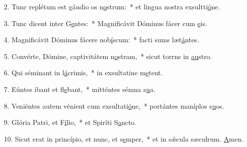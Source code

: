 2. Tunc replétum est gáudio os n\uline{o}strum:~* et lingua nostra exsultti\uline{ó}ne.\par 
3. Tunc dicent inter G\uline{e}ntes:~* Magnificávit Dóminus fácer cum \uline{e}is.\par 
4. Magnificávit Dóminus fácere nob\uline{í}scum:~* facti sums læt\uline{á}ntes.\par 
5. Convérte, Dómine, captivitátem n\uline{o}stram,~* sicut torrns in \uline{au}stro.\par 
6. Qui séminant in l\uline{á}crimis,~* in exsultatine m\uline{e}tent.\par 
7. Eúntes ibant et fl\uline{e}bant,~* mitténtes sémna s\uline{u}a.\par 
8. Veniéntes autem vénient cum exsultati\uline{ó}ne,~* portántes maníplos s\uline{u}os.\par 
9. Glória Patri, et F\uline{í}lio,~* et Spiríti S\uline{a}ncto.\par 
10. Sicut erat in princípio, et nunc, et s\uline{e}mper,~* et in sǽcula sæculrum. \uline{A}men.\par 
